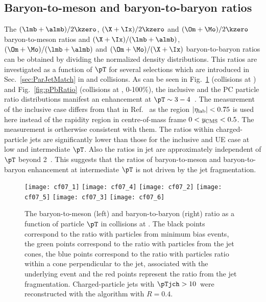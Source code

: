 \documentclass[ALICE,manyauthors]{cernphprep}
\begin{document}
\clearpage
\subsection{Baryon-to-meson and baryon-to-baryon ratios}
\label{subsec:ParRatios}
The $(\lmb + \almb)/2\kzero$, $(\X + \Ix)/2\kzero$ and $(\Om + \Mo)/2\kzero$ baryon-to-meson ratios and $(\X + \Ix)/(\lmb + \almb)$, $(\Om + \Mo)/(\lmb + \almb)$ and $(\Om + \Mo)/(\X + \Ix)$ baryon-to-baryon ratios can be obtained by dividing the normalized density distributions.
This ratios are investigated as a function of $\pT$ for several selections which are introduced in Sec.~\ref{sec:ParJetMatch} in \pp and \pPb collisions.
As can be seen in Fig.~\ref{fig:ppRatio} (\pp collisions at \thirteen) and Fig.~\ref{fig:pPbRatio} (\pPb collisions at \fivenn, 0-100\%), the inclusive and the PC particle ratio distributions manifest an enhancement at $\pT \sim 3 - 4 $~\GeVc.
The measurement of the inclusive case differs from that in Ref.~\cite{ALICE:2015mpp, ALICE:2016dei, ALICE:2013wgn} as the region $|\eta_{\rm lab}| < 0.75$ is used here instead of the rapidity region in centre-of-mass frame $0 < y_{\rm CMS} < 0.5$. 
The measurement is ortherwise consistent with them.
The ratios within charged-particle jets are significantly lower than those for the inclusive and UE case at low and intermediate $\pT$.
Also the ratios in jet are approximately independent of $\pT$ beyond 2~\GeVc.
This suggests that the ratios of baryon-to-meson and baryon-to-baryon enhancement at intermediate $\pT$ is not driven by the jet fragmentation.
\begin{figure}[!ht]
	\begin{center}
		\texttt{[image: cf07\_1]}
		\texttt{[image: cf07\_4]}
		\texttt{[image: cf07\_2]}
		\texttt{[image: cf07\_5]}
		\texttt{[image: cf07\_3]}
		\texttt{[image: cf07\_6]}
	\end{center}
	\caption{The baryon-to-meson (left) and baryon-to-baryon (right) ratio as a function of particle $\pT$ in \pp collisions at \thirteen. The black points correspond to the ratio with particles from minimum bias events, the green points correspond to the ratio with particles from the jet cones, the blue points correspond to the ratio with particles ratio within a cone perpendicular to the jet, associated with the underlying event and the red points represent the ratio from the jet fragmentation. Charged-particle jets with $\pTjch > 10$~\GeVc were reconstructed with the \akT algorithm with $R = 0.4$.}
	\label{fig:ppRatio}
\end{figure}
\end{document}

